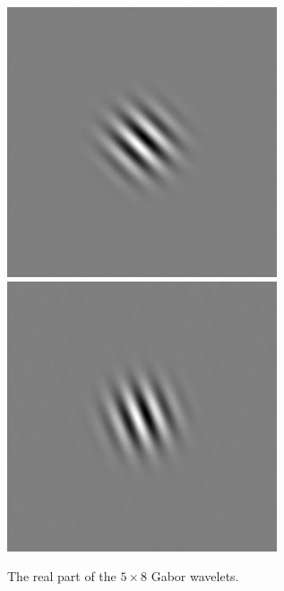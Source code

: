 \begin{figure}[ht]
\begin{center}
 \includegraphics[width=\columnwidth/9]{ch4/figures/rGabor4_6.jpg}
 \includegraphics[width=\columnwidth/9]{ch4/figures/rGabor4_7.jpg}\\
\caption{The real part of the $5\times8$ Gabor wavelets.}
\label{fig:realgabor}
\end{center}
\end{figure} 
